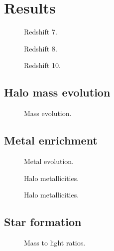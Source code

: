 \documentclass[useAMS,usenatbib]{mn2e}
\begin{document}
\section{Results}
\label{sec:results}

\begin{figure*}
  \caption{\label{fig:z7-mosaic} Redshift 7.}
\end{figure*}

\begin{figure*}
  \caption{\label{fig:z8-mosaic} Redshift 8.}
\end{figure*}

\begin{figure*}
  \caption{\label{fig:z10-mosaic} Redshift 10.}
\end{figure*}

\subsection{Halo mass evolution}

\begin{figure}
  \caption{\label{fig:massevo} Mass evolution.}
\end{figure}

\subsection{Metal enrichment}

\begin{figure}
  \caption{\label{fig:Zevo} Metal evolution.}
\end{figure}

\begin{figure}
  \caption{\label{fig:zhalo} Halo metallicities.}
\end{figure}

\begin{figure}
  \caption{\label{fig:ztot} Halo metallicities.}
\end{figure}

\subsection{Star formation}

\begin{figure}
  \caption{\label{fig:ML} Mass to light ratios.}
\end{figure}
\end{document}
